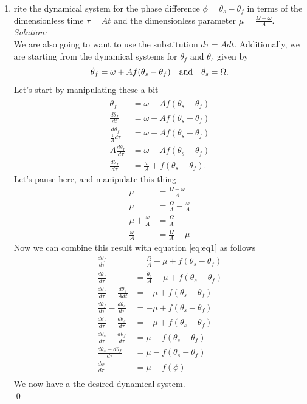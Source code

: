 \documentclass[10pt]{amsart}
\theoremstyle{nonumberplain}
\begin{document}
\begin{enumerate}[label={\bf {\arabic*}:}]
\begin{enumerate}
\item rite the dynamical system for the phase difference $\phi = \theta_s - \theta_f$ in terms of the dimensionless time $\tau = At$ and the dimensionless parameter $\mu = \frac {\Omega - \omega} A$. \\
\textit{Solution:} \\
We are also going to want to use the substitution $d \tau = A d t$.
Additionally, we are starting from the dynamical systems for $\theta_f$ and $\theta_s$ given by
$$\dot \theta_f = \omega + A f(\theta_s - \theta_f) \quad {\rm and }\quad \dot \theta_s = \Omega.$$
Let's start by manipulating these a bit
\begin{align}
\dot \theta_f &= \omega + A f(\theta_s - \theta_f) \nonumber \\
\frac {d \theta_f}{dt} &= \omega + A f(\theta_s - \theta_f) \nonumber \\
\frac {d \theta_f}{\frac 1 A d \tau} &= \omega + A f(\theta_s - \theta_f) \nonumber \\
A \frac {d \theta_f}{d \tau} &= \omega + A f(\theta_s - \theta_f) \nonumber \\
\frac {d \theta_f}{d \tau} &= \frac \omega A + f(\theta_s - \theta_f).
\label{eq:eq1}
\end{align}
Let's pause here, and manipulate this thing
\begin{align*}
\mu &= \frac {\Omega - \omega} A \\
\mu &= \frac \Omega A - \frac \omega A \\
\mu + \frac \omega A &= \frac \Omega A \\
\frac \omega A &= \frac \Omega A - \mu
\end{align*}
Now we can combine this result with equation \eqref{eq:eq1} as follows
\begin{align*}
\frac {d \theta_f}{d \tau} &= \frac \Omega A - \mu + f(\theta_s - \theta_f) \\
\frac {d \theta_f}{d \tau} &= \frac {\dot \theta_s} A - \mu + f(\theta_s - \theta_f) \\
\frac {d \theta_f}{d \tau} - \frac {d \theta_s} {A d t} &= - \mu + f(\theta_s - \theta_f) \\
\frac {d \theta_f}{d \tau} - \frac {d \theta_s} {d \tau} &= - \mu + f(\theta_s - \theta_f) \\
\frac {d \theta_f}{d \tau} - \frac {d \theta_s} {d \tau} &= - \mu + f(\theta_s - \theta_f) \\
\frac {d \theta_s} {d \tau} - \frac {d \theta_f}{d \tau} &= \mu - f(\theta_s - \theta_f) \\
\frac {d \theta_s - d \theta_f} {d \tau} &= \mu - f(\theta_s - \theta_f) \\
\frac {d \phi} {d \tau} &= \mu - f(\phi) \\
\end{align*}
We now have a the desired dynamical system. \\
\qed \\


\end{enumerate}
\end{enumerate}
\end{document}
